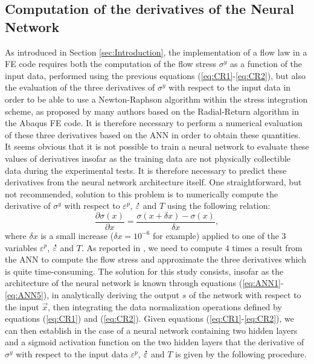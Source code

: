 \documentclass[algorithms,article,submit,pdftex,moreauthors]{Definitions/mdpi}
\DeclareRobustCommand{\mdot}[1]{\accentset{\mbox{\bfseries .}}{#1}}
\begin{document}
\subsection{Computation of the derivatives of the Neural Network}\label{sec:ANN-derivative}

As introduced in Section \ref{sec:Introduction}, the implementation of a flow law in a FE code requires both the computation of the flow stress $\sigma^y$ as a function of the input data, performed using the previous equations (\ref{eq:CR1}-\ref{eq:CR2}), but also the evaluation of the three derivatives of $\sigma^y$ with respect to the input data in order to be able to use a Newton-Raphson algorithm within the stress integration scheme, as proposed by many authors \cite{Ponthot-2002, Ming-2018, Liang-2022, Simo-1998} based on the Radial-Return algorithm in the Abaqus FE code.
It is therefore necessary to perform a numerical evaluation of these three derivatives based on the ANN in order to obtain these quantities.
It seems obvious that it is not possible to train a neural network to evaluate these values of derivatives insofar as the training data are not physically collectible data during the experimental tests.
It is therefore necessary to predict these derivatives from the neural network architecture itself.
One straightforward, but not recommended, solution to this problem is to numerically compute the derivative of $\sigma^y$ with respect to $\varepsilon^p$, $\mdot\varepsilon$ and $T$ using the following relation:
\begin{equation}
\frac{\partial \sigma(x)}{\partial x} = \frac{\sigma(x+\delta x) - \sigma(x)}{\delta x},
\end{equation}
where $\delta x$ is a small increase ($\delta x=10^{-6}$ for example) applied to one of the $3$ variables $\varepsilon^p$, $\mdot\varepsilon$ and $T$.
As reported in \cite{Pantale-2021}, we need to compute $4$ times a result from the ANN to compute the flow stress and approximate the three derivatives which is quite time-consuming.
The solution for this study consists, insofar as the architecture of the neural network is known through equations (\ref{eq:ANN1}-\ref{eq:ANN5}), in analytically deriving the output $s$ of the network with respect to the input $\overrightarrow{x}$, then integrating the data normalization operations defined by equations (\ref{eq:CR1}) and (\ref{eq:CR2}).
Given equations (\ref{eq:CR1}-\ref{eq:CR2}), we can then establish in the case of a neural network containing two hidden layers and a sigmoid activation function on the two hidden layers that the derivative of $\sigma^y$ with respect to the input data $\varepsilon^p$, $\mdot\varepsilon$ and $T$ is given by the following procedure.
\end{document}
